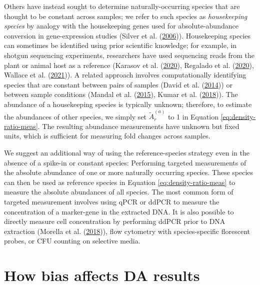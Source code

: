 \documentclass[
]{article}
\begin{document}
Others have instead sought to determine naturally-occurring species that are thought to be constant across samples; we refer to such species as \emph{housekeeping species} by analogy with the housekeeping genes used for absolute-abundance conversion in gene-expression studies (Silver et al. (\protect\hyperlink{ref-silver2006sele}{2006})).
Housekeeping species can sometimes be identified using prior scientific knowledge; for example, in shotgun sequencing experiments, researchers have used sequencing reads from the plant or animal host as a reference (Karasov et al. (\protect\hyperlink{ref-karasov2020ther}{2020}), Regalado et al. (\protect\hyperlink{ref-regalado2020comb}{2020}), Wallace et al. (\protect\hyperlink{ref-wallace2021thed}{2021})).
A related approach involves computationally identifying species that are constant between pairs of samples (David et al. (\protect\hyperlink{ref-david2014host}{2014})) or between sample conditions (Mandal et al. (\protect\hyperlink{ref-mandal2015anal}{2015}), Kumar et al. (\protect\hyperlink{ref-kumar2018anal}{2018})).
The abundance of a housekeeping species is typically unknown; therefore, to estimate the abundances of other species, we simply set \(\tilde A_r^{(a)}\) to 1 in Equation \eqref{eq:density-ratio-meas}.
The resulting abundance measurements have unknown but fixed units, which is sufficient for measuring fold changes across samples.

We suggest an additional way of using the reference-species strategy even in the absence of a spike-in or constant species:
Performing targeted measurements of the absolute abundance of one or more naturally occurring species.
These species can then be used as reference species in Equation \eqref{eq:density-ratio-meas} to measure the absolute abundances of all species.
The most common form of targeted measurement involves using qPCR or ddPCR to measure the concentration of a marker-gene in the extracted DNA.
It is also possible to directly measure cell concentration by performing ddPCR prior to DNA extraction (Morella et al. (\protect\hyperlink{ref-morella2018rapi}{2018})), flow cytometry with species-specific florescent probes, or CFU counting on selective media.

\hypertarget{differential-abundance}{%
\section{How bias affects DA results}\label{differential-abundance}}
\end{document}
